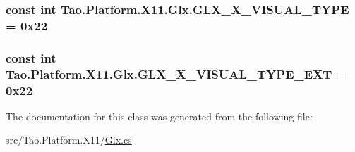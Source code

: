 \label{class_tao_1_1_platform_1_1_x11_1_1_glx_af839e96ef74a4a68ba5f6b93012f804c}
\hypertarget{class_tao_1_1_platform_1_1_x11_1_1_glx_a0b25c68a108b2b1e3fd9a45a758e16f5}{
\subsubsection[{GLX\_\-X\_\-VISUAL\_\-TYPE}]{\setlength{\rightskip}{0pt plus 5cm}const int {\bf Tao.Platform.X11.Glx.GLX\_\-X\_\-VISUAL\_\-TYPE} = 0x22}}
\label{class_tao_1_1_platform_1_1_x11_1_1_glx_a0b25c68a108b2b1e3fd9a45a758e16f5}
\hypertarget{class_tao_1_1_platform_1_1_x11_1_1_glx_a2daf7c1f9d1e7abca98e0365a6d6adc5}{
\subsubsection[{GLX\_\-X\_\-VISUAL\_\-TYPE\_\-EXT}]{\setlength{\rightskip}{0pt plus 5cm}const int {\bf Tao.Platform.X11.Glx.GLX\_\-X\_\-VISUAL\_\-TYPE\_\-EXT} = 0x22}}
\label{class_tao_1_1_platform_1_1_x11_1_1_glx_a2daf7c1f9d1e7abca98e0365a6d6adc5}


The documentation for this class was generated from the following file:\begin{DoxyCompactItemize}
\item 
src/Tao.Platform.X11/\hyperlink{_glx_8cs}{Glx.cs}\end{DoxyCompactItemize}
